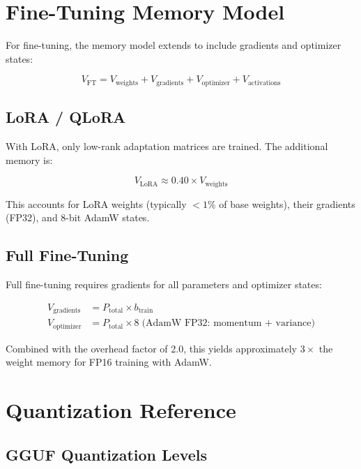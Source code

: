\documentclass[11pt,a4paper]{article}
\theoremstyle{definition}
\begin{document}
\section{Fine-Tuning Memory Model}

For fine-tuning, the memory model extends to include gradients and optimizer states:

\begin{equation}\label{eq:ft_total}
V_{\text{FT}} = V_{\text{weights}} + V_{\text{gradients}} + V_{\text{optimizer}} + V_{\text{activations}}
\end{equation}

\subsection{LoRA / QLoRA}

With LoRA, only low-rank adaptation matrices are trained. The additional memory is:

\begin{equation}\label{eq:lora}
V_{\text{LoRA}} \approx 0.40 \times V_{\text{weights}}
\end{equation}

This accounts for LoRA weights (typically $<1\%$ of base weights), their gradients (FP32), and 8-bit AdamW states.

\subsection{Full Fine-Tuning}

Full fine-tuning requires gradients for all parameters and optimizer states:

\begin{align}
V_{\text{gradients}} &= P_{\text{total}} \times b_{\text{train}} \label{eq:grad} \\
V_{\text{optimizer}} &= P_{\text{total}} \times 8 \;\text{(AdamW FP32: momentum + variance)} \label{eq:opt}
\end{align}

Combined with the overhead factor of 2.0, this yields approximately $3\times$ the weight memory for FP16 training with AdamW.

\section{Quantization Reference}

\subsection{GGUF Quantization Levels}
\end{document}
